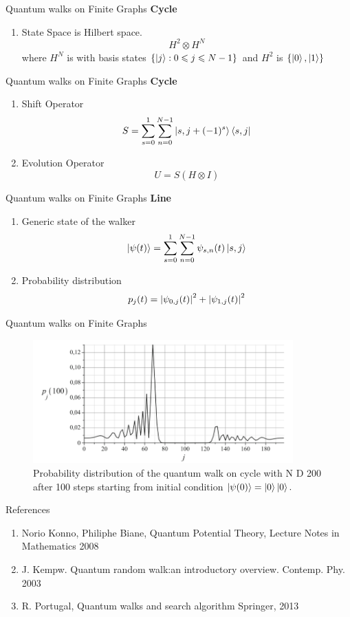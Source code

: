 \documentclass[xcolor=svgnames]{beamer}
\def\leq{\leqslant}
\newcommand{\tens}[1]{
  \mathbin{\mathop{\otimes}\limits_{#1}}}
\begin{document}
\begin{frame}{Quantum walks on Finite Graphs }
\textbf{Cycle}
\begin{enumerate}
    \item State Space is Hilbert space. $$H^2 \tens{} H^N$$ where $H^N$ is with basis states $\{\ket{j} : 0\leq j \leq N-1 \}$ and $H^2$ is $\{\ket{0},\ket{1}\}$
    
\end{enumerate}
    
\end{frame}

\begin{frame}{Quantum walks on Finite Graphs }
\textbf{Cycle}
\begin{enumerate}
    \item Shift Operator
    $$ S = \sum_{s=0}^{1}\sum_{n = 0}^{N-1} \ket{s,j+(-1)^s}\bra{s,j}$$
    \item Evolution Operator $$ U = S(H \tens{} I)$$
\end{enumerate}
\end{frame}

\begin{frame}{Quantum walks on Finite Graphs }
\textbf{Line}
\begin{enumerate}
    \item Generic state of the walker
    $$ \ket{\psi(t)} = \sum_{s=0}^{1}\sum_{n = 0}^{N-1} \psi_{s,n}(t)\ket{s,j}$$
    \item Probability distribution $$ p_{j}(t) = \abs{\psi_{0,j}(t)}^2 + \abs{\psi_{1,j}(t)}^2$$
\end{enumerate}
\end{frame}

\begin{frame}{Quantum walks on Finite Graphs}
\begin{figure}
    \centering
    \includegraphics[width = 10cm]{PDFinite.png}
    \caption{Probability distribution of the quantum walk on cycle with N D 200 after 100 steps starting from initial condition $\ket{\psi(0)} = \ket{0}\ket{0}.$}
\end{figure}
\end{frame}

\begin{frame}{References}
\begin{enumerate}
 \item Norio Konno, Philiphe Biane, Quantum Potential Theory, Lecture Notes in Mathematics 2008
 \item J. Kempw. Quantum random walk:an introductory overview. Contemp. Phy. 2003
\item R. Portugal, Quantum walks and search algorithm Springer, 2013
\end{enumerate}
\end{frame}
\end{document}
